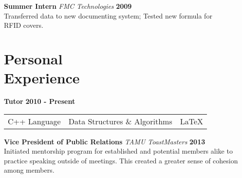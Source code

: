 \documentclass[margin,line,12pt]{res}
\begin{document}
{\begin{resume}


{\bf Summer Intern} {\em FMC Technologies} \hfill {\bf 2009} \
\\
Transferred data to new documenting system; Tested new formula for \\ RFID covers.

\vspace*{.20in}
{\color{Black}
  \section{\sc Personal \\ Experience}}
{\bf Tutor} \hfill {\bf 2010 - Present} \
\\
\begin{tabular}{l l l}
  C++ Language & Data Structures \& Algorithms & \LaTeX{}
\end{tabular}

\vspace{-.13in}
{\bf Vice President of Public Relations} {\em TAMU ToastMasters} \hfill {\bf 2013} \
\\
Initiated mentorship program for established and potential members alike to practice speaking outside of meetings. This created a greater sense of cohesion among members.




\end{resume}}
\end{document}
